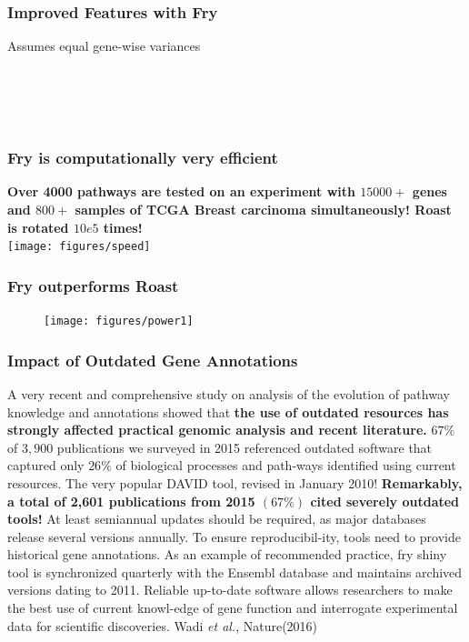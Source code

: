 \documentclass[9pt,t]{beamer}
\begin{document}
\begin{frame}
\frametitle{Improved Features with Fry}
Assumes equal gene-wise variances\\
\vfill
  \\
\vfill
  \\
\vfill
{}\\
\vfill
{}\\
\vfill
{}
\end{frame}

\begin{frame}
\frametitle{Fry is computationally very efficient}
\vfill
\large\textbf{\color{oxygenpurple}Over 4000 pathways are tested on an experiment with $15000+$ genes and $800+$ samples of TCGA Breast carcinoma simultaneously! Roast is rotated $10e5$ times!}\\
\vfill
\texttt{[image: figures/speed]}
\end{frame}

\begin{frame}
\frametitle{Fry outperforms Roast}
\begin{figure}
\texttt{[image: figures/power1]}
\end{figure}
\end{frame}
\begin{frame}
\frametitle{Impact of Outdated Gene Annotations}
\vspace{0.2cm}
A very recent and comprehensive study on analysis of the evolution of pathway knowledge and annotations showed that \textbf{\color{oxygenpurple}the use of outdated resources has strongly affected practical genomic analysis and recent literature.} 
\vfill
$67\%$ of $3,900$ publications we surveyed in 2015 referenced outdated software that captured only $26\%$ of biological processes and path-ways identified using current resources.
\vfill
The very popular DAVID tool, revised in January 2010! 
\vfill
\textbf{\color{oxygenrose}Remarkably, a total of 2,601 publications from 2015 $(67\%)$ cited severely outdated tools!}
\vfill
At least semiannual updates should be required, as major databases release several versions annually. To ensure reproducibil-ity, tools need to provide historical gene annotations. As an example of recommended practice, fry shiny tool is synchronized quarterly with the Ensembl database and maintains archived versions dating to 2011. Reliable up-to-date software allows researchers to make the best use of current knowl-edge of gene function and interrogate experimental data for scientific  discoveries.
\vfill 
\hfill
\footnotesize Wadi \emph{et al.}, Nature(2016)
\end{frame}
\end{document}
